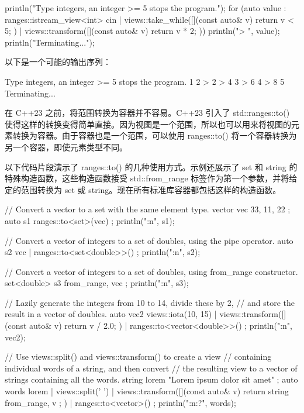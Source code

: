 \begin{cpp}
println("Type integers, an integer >= 5 stops the program.");
for (auto value : ranges::istream_view<int> { cin }
    | views::take_while([](const auto& v) { return v < 5; })
    | views::transform([](const auto& v) { return v * 2; })) {
    println("> {}", value);
}
println("Terminating...");
\end{cpp}

以下是一个可能的输出序列：

\begin{shell}
Type integers, an integer >= 5 stops the program.
1 2
> 2
> 4
3
> 6
4
> 8
5
Terminating...
\end{shell}



在 C++23 之前，将范围转换为容器并不容易。C++23 引入了 std::ranges::to() 使得这样的转换变得简单直接。因为视图是一个范围，所以也可以用来将视图的元素转换为容器。由于容器也是一个范围，可以使用 ranges::to() 将一个容器转换为另一个容器，即使元素类型不同。

以下代码片段演示了 ranges::to() 的几种使用方式。示例还展示了 set 和 string 的特殊构造函数，这些构造函数接受 std::from\_range 标签作为第一个参数，并将给定的范围转换为 set 或 string。现在所有标准库容器都包括这样的构造函数。

\begin{cpp}
// Convert a vector to a set with the same element type.
vector vec { 33, 11, 22 };
auto s1 { ranges::to<set>(vec) };
println("{:n}", s1);

// Convert a vector of integers to a set of doubles, using the pipe operator.
auto s2 { vec | ranges::to<set<double>>() };
println("{:n}", s2);

// Convert a vector of integers to a set of doubles, using from_range constructor.
set<double> s3 { from_range, vec };
println("{:n}", s3);

// Lazily generate the integers from 10 to 14, divide these by 2,
// and store the result in a vector of doubles.
auto vec2 { views::iota(10, 15)
    | views::transform([](const auto& v) { return v / 2.0; })
    | ranges::to<vector<double>>() };
println("{:n}", vec2);

// Use views::split() and views::transform() to create a view
// containing individual words of a string, and then convert
// the resulting view to a vector of strings containing all the words.
string lorem { "Lorem ipsum dolor sit amet" };
auto words { lorem | views::split(' ')
    | views::transform([](const auto& v) { return string { from_range, v }; })
    | ranges::to<vector>() };
println("{:n:?}", words);
\end{cpp}

